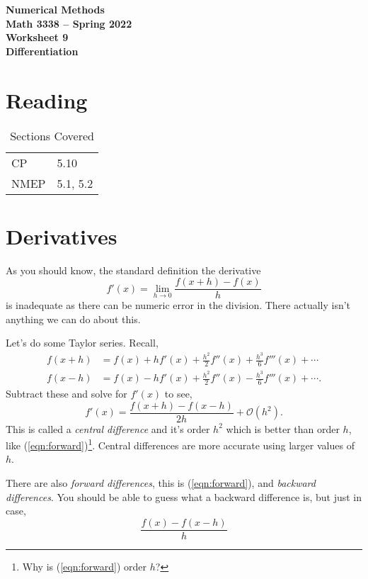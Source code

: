 \documentclass[11pt,letterpaper]{article}
\newcommand{\semester}{Spring 2022}
\newcommand{\bigO}{\mathcal{O}}
\begin{document}
\begin{center}
{\huge{\bf  Numerical Methods}} \\[1.5ex]
{\bf Math 3338 -- \semester}\\[1.5ex]
{\Large{\bf Worksheet 9\ \\[2ex] Differentiation}}\\
\end{center}
\vspace{2mm}


\section*{Reading}

\begin{table}[!ht]
 \centering
 \begin{tabular}{ll}
   CP &  5.10\\
 NMEP & 5.1, 5.2
 \end{tabular}
\caption{Sections Covered}
\end{table}


\section{Derivatives}

As you should know, the standard definition the derivative
\begin{equation}
\label{eqn:forward}
f'(x) = \lim_{h\rightarrow 0}\frac{f(x+h)-f(x)}{h}
\end{equation}
is inadequate as there can be numeric error in the division. There actually isn't anything
we can do about this. 


Let's do some Taylor series. Recall,
\begin{align*}
 f(x+h) &= f(x) + hf'(x) + \frac{h^2}{2}f''(x) + \frac{h^3}{6}f'''(x)+\cdots \\
 f(x-h) &= f(x) - hf'(x) + \frac{h^2}{2}f''(x) - \frac{h^3}{6}f'''(x)+\cdots.
\end{align*}
Subtract these and solve for $f'(x)$ to see,
\begin{equation}
 \label{eqn:central}
 f'(x) = \frac{f(x+h)-f(x-h)}{2h} + \bigO(h^2).
\end{equation}
This is called a \emph{central difference} and it's order $h^2$ which is better than order
$h$, like (\ref{eqn:forward})\footnote{Why is (\ref{eqn:forward}) order $h$?}. Central 
differences are more accurate using larger values of $h$.

There are also \emph{forward differences}, this is (\ref{eqn:forward}), and \emph{backward differences}.
You should be able to guess what a backward difference is, but just in case,
\[
\frac{f(x)-f(x-h)}{h}
\]
\end{document}
